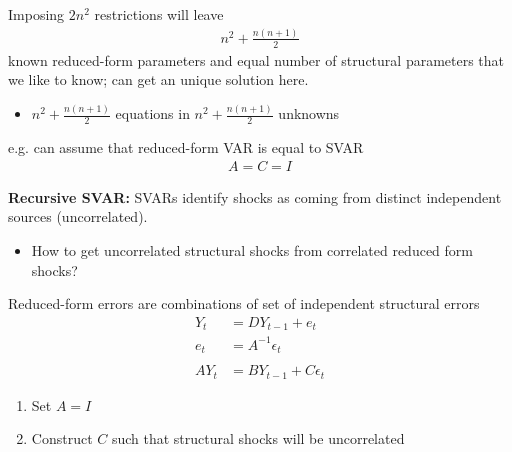 \documentclass{beamer}
\begin{document}
\begin{frame}
  Imposing $2n^2$ restrictions will leave 
  \begin{align}
    n^2+\frac{n(n+1)}{2}
  \end{align}
  \medskip
  known reduced-form parameters and equal number of structural parameters that we like to know; can get an unique solution here.
  \begin{itemize}
    \item $n^2+\frac{n(n+1)}{2}$ equations in $n^2+\frac{n(n+1)}{2}$ unknowns
  \end{itemize}
  \medskip
  e.g. can assume that reduced-form VAR is equal to SVAR
  \begin{align}
    A=C=I
  \end{align}
\end{frame}

\begin{frame}
  \textbf{Recursive SVAR:} SVARs identify shocks as coming from distinct independent sources (uncorrelated).
  \begin{itemize}
    \item How to get uncorrelated structural shocks from correlated reduced form shocks?
  \end{itemize}
  \medskip
  Reduced-form errors are combinations of set of independent structural errors
  \begin{align*}
    Y_t &= DY_{t-1} + e_t\\ 
    e_t &= A^{-1} \epsilon_t \\\\ 
    AY_t &= BY_{t-1} + C\epsilon_t  
  \end{align*}
  \begin{enumerate}
    \item Set $A = I$
    \item Construct $C$ such that structural shocks will be uncorrelated
  \end{enumerate}
\end{frame}
\end{document}
